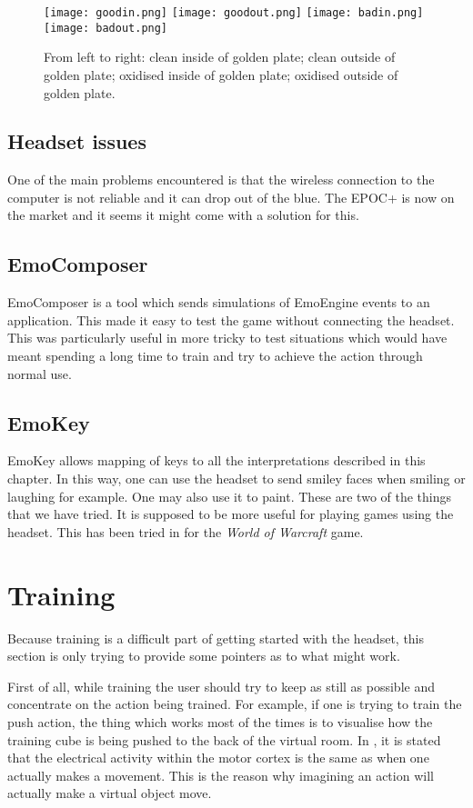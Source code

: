 \begin{figure}
  \centering
  \texttt{[image: goodin.png]} \texttt{[image: goodout.png]} \texttt{[image: badin.png]} \texttt{[image: badout.png]}
  \caption{From left to right: clean inside of golden plate; clean outside of golden plate; oxidised inside of golden plate; oxidised outside of golden plate.}
    \label{fig:cleanVsOxidised}           
\end{figure}

\subsection{Headset issues}
One of the main problems encountered is that the wireless connection to the computer is not reliable and it can drop out of the blue. The EPOC+ is now on the market and it seems it might come with a solution for this.

\subsection{EmoComposer}
\label{part:emocomposer}
EmoComposer is a tool which sends simulations of EmoEngine events to an application. This made it easy to test the game without connecting the headset. This was particularly useful in more tricky to test situations which would have meant spending a long time to train and try to achieve the action through normal use. 

\subsection{EmoKey}
EmoKey allows mapping of keys to all the interpretations described in this chapter. In this way, one can use the headset to send smiley faces when smiling or laughing for example. One may also use it to paint. These are two of the things that we have tried. It is supposed to be more useful for playing games using the headset. This has been tried in \cite{wowControl} for the \textit{World of Warcraft} game.

\section{Training}
Because training is a difficult part of getting started with the headset, this section is only trying to provide some pointers as to what might work. 

First of all, while training the user should try to keep as still as possible and concentrate on the action being trained. For example, if one is trying to train the push action, the thing which works most of the times is to visualise how the training cube is being pushed to the back of the virtual room. In \cite{quadriplegic}, it is stated that the electrical activity within the motor cortex is the same as when one actually makes a movement. This is the reason why imagining an action will actually make a virtual object move.

